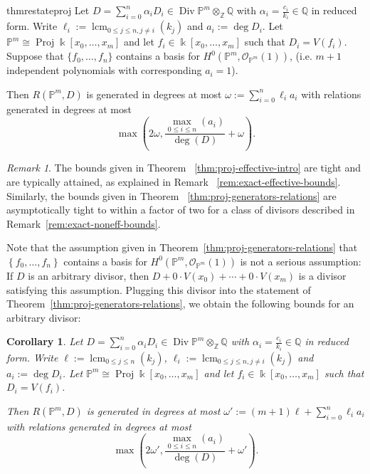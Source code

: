 \documentclass{amsart}
\theoremstyle{plain}
\newtheorem{cor}[thm]{Corollary}
\theoremstyle{definition}
\theoremstyle{remark}
\newtheorem{rem}[thm]{Remark}
\numberwithin{equation}{section}
\newcommand\bq{{\mathbb Q}}
\newcommand\bp{{\mathbb P}}
\newcommand\bz{{\mathbb Z}}
\newcommand\bk{{\Bbbk}}
\newcommand\sco{{\mathscr O}}
\DeclareMathOperator\di{Div}
\newcommand\bida{a}
\DeclareMathOperator{\proj}{Proj}
\DeclareMathOperator{\lcm}{lcm}
\begin{document}
\begin{restatable}{thm}{restateproj}
\label{thm:proj-generators-relations}
Let $D = \sum_{i = 0}^n \alpha_i D_i \in \di \bp^m \otimes_\bz \bq$
with $\alpha_i = \frac{c_i}{k_i}\in \bq$ in reduced form. Write
$\ell_i := \lcm_{0\le j \le n, j \ne i}(k_j)$ and $a_i := \deg D_i$. Let $\bp^m
\cong \proj \bk[x_0, \ldots, x_m]$ and let
$f_i \in \bk[x_0, \ldots, x_m]$ such that $D_i = V(f_i)$. 
Suppose that $\{f_0, \ldots, f_n\}$ contains a basis
for $H^0(\bp^m, \sco_{\bp^m}(1))$, {\rm(}i.e. $m+1$ independent polynomials with
corresponding $a_i = 1${\rm)}.

Then $R(\bp^m, D)$ is generated in degrees at most 
$\omega := \sum_{i = 0}^n \ell_i a_i$
with relations generated in degrees at most
\[
	\max \left(2 \omega, \frac{\max_{0 \le i \le n}
	(	\bida_i)}{\deg(D)} + \omega \right).
\]
\end{restatable}

\begin{rem}
\label{rem:proj-tight-bounds}
The bounds
given in Theorem ~\ref{thm:proj-effective-intro}
are tight and are typically attained, as explained in
Remark ~\ref{rem:exact-effective-bounds}.
Similarly, the bounds given in Theorem 
~\ref{thm:proj-generators-relations} are asymptotically
tight to within a factor of two 
for a class of divisors described in
Remark~\ref{rem:exact-noneff-bounds}.
\end{rem}

Note that the assumption given in Theorem~\ref{thm:proj-generators-relations}
that $\left\{ f_0, \ldots, f_n \right\}$ contains a basis for $H^0(\bp^m, \sco_{\bp^m}(1))$ is not a serious assumption:
If $D$ is an arbitrary divisor, then $D + 0 \cdot V(x_0) + \cdots + 0 \cdot V(x_m)$ is a divisor satisfying this assumption. Plugging this divisor into the statement
of Theorem~\ref{thm:proj-generators-relations}, we obtain the following bounds for an arbitrary divisor:
\begin{cor}
\label{cor:proj-generators-relations}
Let $D = \sum_{i = 0}^n \alpha_i D_i \in \di \bp^m \otimes_\bz \bq$ 
with $\alpha_i = \frac{c_i}{k_i}\in \bq$ in reduced form. Write
$\ell := \lcm_{0 \leq j \leq n}(k_j)$, $\ell_i := \lcm_{0\le j \le n, j \ne i}(k_j)$ and $a_i := \deg D_i$. Let $\bp^m
\cong \proj \bk[x_0, \ldots, x_m]$ and let
$f_i \in \bk[x_0, \ldots, x_m]$ such that $D_i = V(f_i)$. 

Then $R(\bp^m, D)$ is generated in degrees at most 
$\omega' := (m+1)\ell + \sum_{i = 0}^n \ell_i a_i$
with relations generated in degrees at most
\[
	\max \left(2 \omega', \frac{\max_{0 \le i \le n}
	(	\bida_i)}{\deg(D)} + \omega' \right).
\]
\end{cor}
\end{document}
